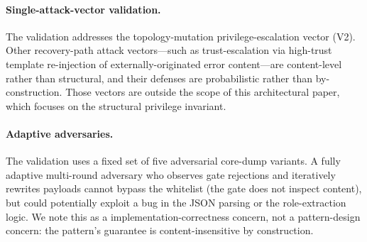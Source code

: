 \paragraph{Single-attack-vector validation.}
The validation addresses the topology-mutation privilege-escalation vector (V2). Other recovery-path attack vectors---such as trust-escalation via high-trust template re-injection of externally-originated error content---are content-level rather than structural, and their defenses are probabilistic rather than by-construction. Those vectors are outside the scope of this architectural paper, which focuses on the structural privilege invariant.

\paragraph{Adaptive adversaries.}
The validation uses a fixed set of five adversarial core-dump variants. A fully adaptive multi-round adversary who observes gate rejections and iteratively rewrites payloads cannot bypass the whitelist (the gate does not inspect content), but could potentially exploit a bug in the JSON parsing or the role-extraction logic. We note this as a implementation-correctness concern, not a pattern-design concern: the pattern's guarantee is content-insensitive by construction.

